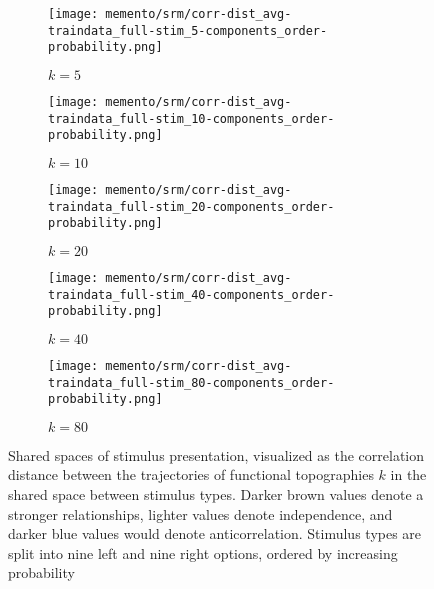 \begin{figure}[H]
	\centering
	\begin{subfigure}{.18\textwidth}
		\texttt{[image: memento/srm/corr-dist\_avg-traindata\_full-stim\_5-components\_order-probability.png]}
		\caption{$k=5$}
		\label{fig:shared5}
	\end{subfigure}
	\begin{subfigure}{0.18\textwidth}
		\texttt{[image: memento/srm/corr-dist\_avg-traindata\_full-stim\_10-components\_order-probability.png]}
		\caption{$k=10$}
		\label{fig:shared10}
	\end{subfigure}
	\begin{subfigure}{.18\textwidth}
		\texttt{[image: memento/srm/corr-dist\_avg-traindata\_full-stim\_20-components\_order-probability.png]}
		\caption{$k=20$}
		\label{fig:shared20}
	\end{subfigure}
	\begin{subfigure}{0.18\textwidth}
		\texttt{[image: memento/srm/corr-dist\_avg-traindata\_full-stim\_40-components\_order-probability.png]}
		\caption{$k=40$}
		\label{fig:shared40}
	\end{subfigure}
	\begin{subfigure}{0.18\textwidth}
		\texttt{[image: memento/srm/corr-dist\_avg-traindata\_full-stim\_80-components\_order-probability.png]}
		\caption{$k=80$}
		\label{fig:shared80}
	\end{subfigure}
	\caption[Shared spaces of stimulus presentations]{Shared spaces of stimulus presentation, visualized as the correlation distance between the trajectories of functional topographies $k$ in the shared space between stimulus types. Darker brown values denote a stronger relationships, lighter values denote independence, and darker blue values would denote anticorrelation. Stimulus types are split into nine left and nine right options, ordered by increasing probability}
	\label{fig:srmsharedspaces}
\end{figure}


